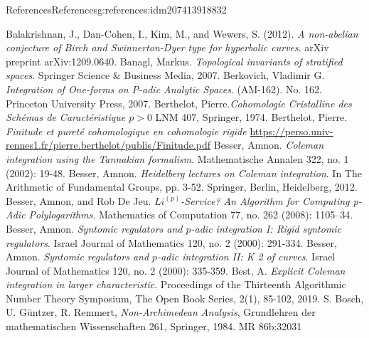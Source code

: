 \documentclass[oneside,10pt,]{book}
\numberwithin{equation}{section}
\newcommand{\gt}{>}
\begin{document}
\begin{references-chapter-numberless}{References}{}{References}{}{}{g:references:idm207413918832}
\begin{thebibliography}{9}
\hypertarget{x:biblio:bib-bala-nonab}{}Balakrishnan, J., Dan-Cohen, I., Kim, M., and Wewers, S. (2012). \textit{A non-abelian conjecture of Birch and Swinnerton-Dyer type for hyperbolic curves}. arXiv preprint arXiv:1209.0640.
\hypertarget{x:biblio:bib-banagl}{}Banagl, Markus. \textit{Topological invariants of stratified spaces}. Springer Science \& Business Media, 2007.
\hypertarget{x:biblio:bib-berkovich}{}Berkovich, Vladimir G.  \textit{Integration of One-forms on P-adic Analytic Spaces}. (AM-162). No. 162. Princeton University Press, 2007.
\hypertarget{x:biblio:bib-berth1}{}Berthelot, Pierre.\textit{Cohomologie Cristalline des Schémas de Caractéristique \(p\gt 0\)} LNM 407, Springer, 1974.
\hypertarget{x:biblio:bib-berth2}{}Berthelot, Pierre.  \textit{Finitude et pureté cohomologique en cohomologie rigide} \url{https://perso.univ-rennes1.fr/pierre.berthelot/publis/Finitude.pdf}
\hypertarget{x:biblio:bib-besser-coleman-tannakian}{}Besser, Amnon. \textit{Coleman integration using the Tannakian formalism}. Mathematische Annalen 322, no. 1 (2002): 19-48.
\hypertarget{x:biblio:bib-besser-coleman-heidelberg}{}Besser, Amnon. \textit{Heidelberg lectures on Coleman integration}. In The Arithmetic of Fundamental Groups, pp. 3-52. Springer, Berlin, Heidelberg, 2012.
\hypertarget{x:biblio:bib-besser-de-jeu}{}Besser, Amnon, and Rob De Jeu. \textit{\(Li^{(p)}\)-Service? An Algorithm for Computing p-Adic Polylogarithms}. Mathematics of Computation 77, no. 262 (2008): 1105–34.
\hypertarget{x:biblio:bib-besser-syntomic-I}{}Besser, Amnon. \textit{Syntomic regulators and \(p\)-adic integration I: Rigid syntomic regulators}. Israel Journal of Mathematics 120, no. 2 (2000): 291-334.
\hypertarget{x:biblio:bib-besser-syntomic-II}{}Besser, Amnon. \textit{Syntomic regulators and \(p\)-adic integration II: K 2 of curves}. Israel Journal of Mathematics 120, no. 2 (2000): 335-359.
\hypertarget{x:biblio:bib-best-coleman-harvey}{}Best, A. \textit{Explicit Coleman integration in larger characteristic}. Proceedings of the Thirteenth Algorithmic Number Theory Symposium, The Open Book Series, 2(1), 85-102, 2019.
\hypertarget{x:biblio:bib-bgr}{}S. Bosch, U. Güntzer, R. Remmert, \textit{Non-Archimedean Analysis}, Grundlehren der mathematischen Wissenschaften 261, Springer, 1984. MR 86b:32031

\end{thebibliography}
\end{references-chapter-numberless}
\end{document}

